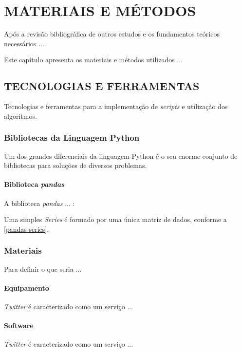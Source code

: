 
\chapter{MATERIAIS E MÉTODOS}\label{ch:materiais-metodos}
Após a revisão bibliográfica de outros estudos e os fundamentos teóricos necessários ....

Este capítulo apresenta os materiais e métodos utilizados ...


\section{TECNOLOGIAS E FERRAMENTAS}\label{sec: tec-ferramenta}
Tecnologias e ferramentas para a implementação de \textit{scripts} e utilização dos algoritmos.

\subsection{Bibliotecas da Linguagem Python}\label{sec:bib_python}
Um dos grandes diferenciais da linguagem Python é o seu enorme conjunto de bibliotecas para soluções de diversos problemas.



\subsubsection{Biblioteca \textit{pandas}}\label{pandas}
A biblioteca \textit{pandas} ... \cite{python-analysis}:

Uma simples \textit{Series} é formado por uma única matriz de dados, conforme a \autoref{pandas-series}.


\subsection{Materiais}
Para definir o que seria ...




\subsubsection{Equipamento}\label{subsub-equipamento}
\textit{Twitter} é caracterizado como um serviço ...


\subsubsection{Software}\label{subsub-softw}
\textit{Twitter} é caracterizado como um serviço ...

